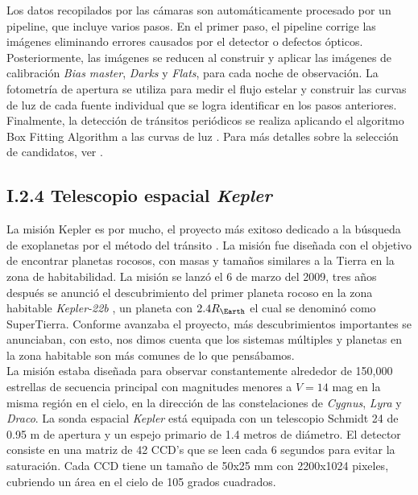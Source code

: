 Los datos recopilados por las cámaras son automáticamente procesado por un pipeline, que incluye varios pasos. En el primer paso, el pipeline corrige las imágenes eliminando errores causados por el detector o defectos ópticos. Posteriormente, las imágenes se reducen al construir y aplicar las imágenes de calibración \textit{Bias master}, \textit{Darks} y \textit{Flats}, para cada noche de observación. La fotometría de apertura se utiliza para medir el flujo estelar y construir las curvas de luz de cada fuente individual que se logra identificar en los pasos anteriores. Finalmente, la detección de tránsitos periódicos se realiza aplicando el algoritmo Box Fitting Algorithm a las curvas de luz \cite{kovacs2002box}. Para más detalles sobre la selección de candidatos, ver \cite{collier2006fast}.\\

\subsection*{I.2.4 Telescopio espacial \textit{Kepler}}

La misión Kepler es por mucho, el proyecto más exitoso dedicado a la búsqueda de exoplanetas por el método del tránsito \cite{borucki2010kepler}. La misión fue diseñada con el objetivo de encontrar planetas rocosos, con masas y tamaños similares a la Tierra en la zona de habitabilidad. La misión se lanzó el 6 de marzo del 2009, tres años después se
anunció el descubrimiento del primer planeta rocoso en la zona habitable \textit{Kepler-22b} \cite{borucki2012kepler}, un planeta con $2.4R_{\Earth}$ el cual se denominó como SuperTierra. Conforme avanzaba el proyecto, más descubrimientos importantes se anunciaban, con esto, nos dimos cuenta que los sistemas múltiples y planetas en la zona habitable son más comunes de lo que pensábamos.\\

La misión estaba diseñada para observar constantemente alrededor de 150,000 estrellas de secuencia principal con magnitudes menores a $V=14$ mag en la misma región en el cielo, en la dirección de las constelaciones de \textit{Cygnus}, \textit{Lyra} y \textit{Draco}. La sonda espacial \textit{Kepler} está equipada con un telescopio Schmidt 24 de 0.95 m de apertura y un espejo primario de 1.4 metros de diámetro. El detector consiste en una matriz de 42 CCD’s que se leen cada 6 segundos para evitar la saturación. Cada CCD tiene un tamaño de 50x25 mm con 2200x1024 pixeles, cubriendo un área en el cielo de 105 grados cuadrados.\\

